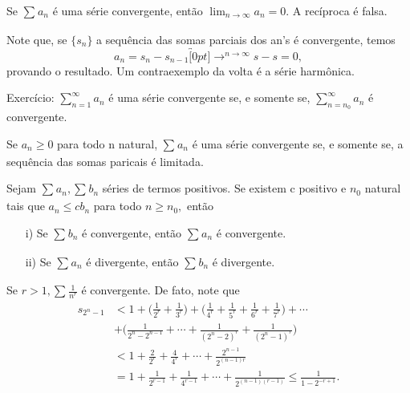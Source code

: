 \documentclass[Analysis/analysis_notes.tex]{subfiles}
\begin{document}
\begin{theorem*}
  Se $\sum\limits_{}^{}a_{n}$ \'e uma s\'erie convergente, ent\~ao $\lim_{n\to\infty}a_{n} = 0.$ A rec\'iproca \'e falsa.
\end{theorem*}
\begin{proof*}
  Note que, se $\{s_{n}\}$ a sequ\^encia das somas parciais dos an's \'e convergente, temos 
    $$
      a_{n} = s_{n} - s_{n-1}\overbracket[0pt]{\longrightarrow}^{n\to \infty} s-s= 0,
    $$
    provando o resultado. Um contraexemplo da volta \'e a s\'erie harm\^onica. \qedsymbol
\end{proof*}
 \begin{example}
   Exerc\'icio: $\sum\limits_{n=1}^{\infty}a_{n}$ \'e uma s\'erie convergente se, e somente se, $\sum\limits_{n=n_{0}}^{\infty}a_{n}$ \'e convergente.
 \end{example}
\begin{theorem*}
  Se $a_{n}\geq{0}$ para todo n natural, $\sum\limits_{}^{}a_{n}$ \'e uma s\'erie convergente se, e somente se, a sequ\^encia das somas paricais \'e limitada.
\end{theorem*}
\begin{theorem*}
  Sejam $\sum\limits_{}^{}a_{n}, \sum\limits_{}^{}b_{n}$ s\'eries de termos positivos. Se existem c positivo e $n_{0}$ natural tais que
 $a_{n} \leq{cb_{n}}$ para todo $n\geq{n_{0}},$ ent\~ao 
\begin{itemize}
  \item[i)] Se $\sum\limits_{}^{}b_{n}$ \'e convergente, ent\~ao $\sum\limits_{}^{}a_{n}$ \'e convergente.
    \item[ii)] Se $\sum\limits_{}^{}a_{n}$ \'e divergente, ent\~ao $\sum\limits_{}^{}b_{n}$ \'e divergente. 
\end{itemize}
\end{theorem*}
\begin{example}
  Se $r > 1, \sum\limits_{}^{}\frac{1}{n^{r}}$ \'e convergente. De fato, note que 
  \begin{align*}
    s_{2^{n}-1} &< 1 + \biggl(\frac{1}{2^{r}}+\frac{1}{3^{r}}\biggr) + \biggl(\frac{1}{4^{r}} + \frac{1}{5^{r}} + \frac{1}{6^{r}}+\frac{1}{7^{r}}\biggr) + \cdots\\
                &+\Biggl(\frac{1}{2^{n}-2^{n-1}}+\cdots+\frac{1}{(2^{n}-2)^{r}} + \frac{1}{(2^{n}-1)^{r}}\Biggr) \\
                &< 1 + \frac{2}{2^{r}} + \frac{4}{4^{r}} + \cdots + \frac{2^{n-1}}{2^{(n-1)r}} \\
                &= 1 + \frac{1}{2^{r-1}} + \frac{1}{4^{r-1}} + \cdots + \frac{1}{2^{(n-1)(r-1)}}\leq{\frac{1}{1-2^{-r+1}}}.
  \end{align*}
\end{example}
\end{document}
